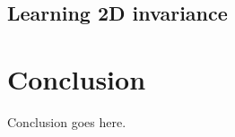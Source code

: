 \documentclass{statsmsc}
\begin{document}
\section{Learning 2D invariance}




\chapter{Conclusion}


Conclusion goes here. 






%
%
\end{document}
